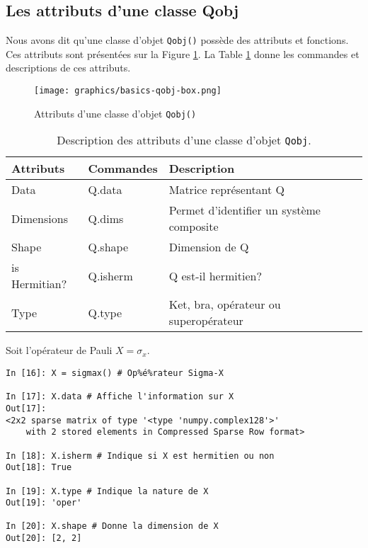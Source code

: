 \subsection{Les attributs d'une classe Qobj}

Nous avons dit qu'une classe d'objet \texttt{Qobj()} possède des attributs et 
fonctions. Ces attributs sont présentées sur la Figure \ref{fig:qobj}. La 
Table \ref{tab:class} donne les commandes et descriptions de ces attributs.

\begin{figure}[htbp]
\centering
 \texttt{[image: graphics/basics-qobj-box.png]}
\caption{Attributs d'une classe d'objet \texttt{Qobj()}}
\label{fig:qobj}
\end{figure}

\begin{table}[htpb]
\centering
\begin{tabular}{|l|l|l|} \hline \hline
\textbf{Attributs} &\textbf{Commandes}	&\textbf{Description}\\ \hline \hline
Data	&Q.data	&Matrice représentant Q\\ \hline
Dimensions	&Q.dims	&Permet d'identifier un système composite\\ \hline
Shape	&Q.shape	&Dimension de Q\\ \hline
is Hermitian?	&Q.isherm	&Q est-il hermitien?\\ \hline
Type	&Q.type	&Ket, bra, opérateur ou superopérateur\\ \hline
\end{tabular}
\caption{Description des attributs d'une classe d'objet \texttt{Qobj}.}
\label{tab:class}
\end{table}

\begin{example}
Soit l'opérateur de Pauli $X=\sigma_x$.\\
\begin{lstlisting}
In [16]: X = sigmax() # Op%é%rateur Sigma-X

In [17]: X.data # Affiche l'information sur X
Out[17]: 
<2x2 sparse matrix of type '<type 'numpy.complex128'>'
	with 2 stored elements in Compressed Sparse Row format>

In [18]: X.isherm # Indique si X est hermitien ou non
Out[18]: True

In [19]: X.type # Indique la nature de X
Out[19]: 'oper'

In [20]: X.shape # Donne la dimension de X
Out[20]: [2, 2]
\end{lstlisting}
\end{example}

